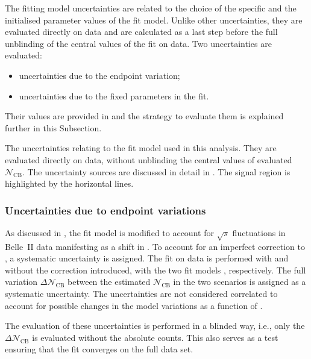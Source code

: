 The \Mbc fitting model uncertainties are related to the choice of the specific  
and the initialised parameter values of the fit model.
Unlike other uncertainties, they are evaluated directly on data and are calculated as a last step
before the full unblinding of the central values of the \Mbc fit on data.
Two uncertainties are evaluated:
\begin{itemize}
    \item uncertainties due to the \Mbc endpoint variation;
    \item uncertainties due to the fixed parameters in the \Mbc fit.
\end{itemize}
Their values are provided in  and the strategy to evaluate them is explained further in this Subsection.

\begin{table}[htbp!]
    \centering
    \caption{\label{tab:fit_uncertainties} 
    The uncertainties relating to the \Mbc fit model used in this analysis.
    They are evaluated directly on data, without unblinding the central values of evaluated $\mathcal{N}_{\mathrm{CB}}$.
    The uncertainty sources are discussed in detail in .
    The signal region is highlighted by the horizontal lines.
    }
    
\end{table}

\subsubsection{Uncertainties due to \texorpdfstring{\Mbc}{Mbc} endpoint variations}\label{sec:fit_endpoint_systematic}

As discussed in , the fit model is modified to account for $\sqrt{s}$ fluctuations in Belle~II data manifesting as a shift in \Mbc.
To account for an imperfect correction to \MC, a systematic uncertainty is assigned.
The fit on data is performed with and without the \Mbc correction introduced, with the two fit models , respectively.
The full variation $\Delta\mathcal{N}_{\mathrm{CB}}$ between the estimated $\mathcal{N}_{\mathrm{CB}}$ in the two scenarios is assigned as a systematic uncertainty.
The uncertainties are not considered correlated to account for possible changes in the model variations as a function of \EB.

The evaluation of these uncertainties is performed in a blinded way, i.e., only the $\Delta\mathcal{N}_{\mathrm{CB}}$ is evaluated without the absolute counts.
This also serves as a test ensuring that the fit converges on the full data set.

